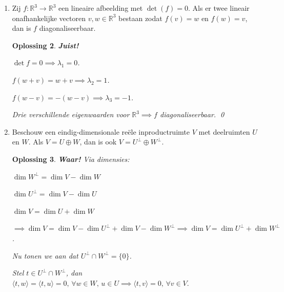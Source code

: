 \documentclass[a4paper,12pt]{article}
\newtheorem{oplossing}{Oplossing}
\begin{document}
\begin{enumerate}
\begin{oplossing}
        Dan geldt:
        \(g\left( f\left(\begin{pmatrix}
            a \\ b
        \end{pmatrix}\right) \right)
        =
        g\left( \begin{pmatrix}
            a \\ b \\ a+b
        \end{pmatrix}\right)
        =
        \begin{pmatrix}
            a \\ b
        \end{pmatrix}
        = \operatorname{id}_V.
        \)

        Maar \(\dim V \neq \dim W\). \qed
    \end{oplossing}
    \item[(iii)] Zij $f:\mathbb{R}^{3} \to \mathbb{R}^{3}$ een lineaire afbeelding met $\det(f)=0$. Als er twee lineair onafhankelijke vectoren $v,w \in \mathbb{R}^{3}$ bestaan zodat $f(v)=w$ en $f(w)=v$, dan is $f$ diagonaliseerbaar.
    \begin{oplossing}
        \textbf{Juist!}

        \(\det f = 0 \implies \lambda_1 = 0\).

        \(f(w+v) = w+v \implies \lambda_2 = 1\).

        \(f(w-v) = -(w-v) \implies \lambda_3 = -1\).

        Drie verschillende eigenwaarden voor \(\mathbb{R}^3 \implies f\) diagonaliseerbaar. \qed
    \end{oplossing}
    \item[(iv)] Beschouw een eindig-dimensionale reële inproductruimte $V$ met deelruimten $U$ en $W$. Als $V=U \oplus W$, dan is ook $V=U^{\perp} \oplus W^{\perp}$.
    \begin{oplossing}
        \textbf{Waar!}
        Via dimensies:

        \(\dim W^\perp = \dim V - \dim W\)

        \(\dim U^\perp = \dim V - \dim U\)

        \(\dim V = \dim U + \dim W \)

        \(\implies \dim V = \dim V - \dim U^\perp + \dim V - \dim W^\perp \implies \dim V = \dim U^\perp + \dim W^\perp\).

        Nu tonen we aan dat \(U^\perp \cap W^\perp = \{0\}\).

        Stel \(t \in U^\perp \cap W^\perp \), dan \(\langle t,w \rangle = \langle t,u \rangle = 0 ,\, \forall w \in W, \, u \in U \implies \langle t,v \rangle = 0 , \, \forall v \in V .\)


\end{oplossing}
\end{enumerate}
\end{document}
